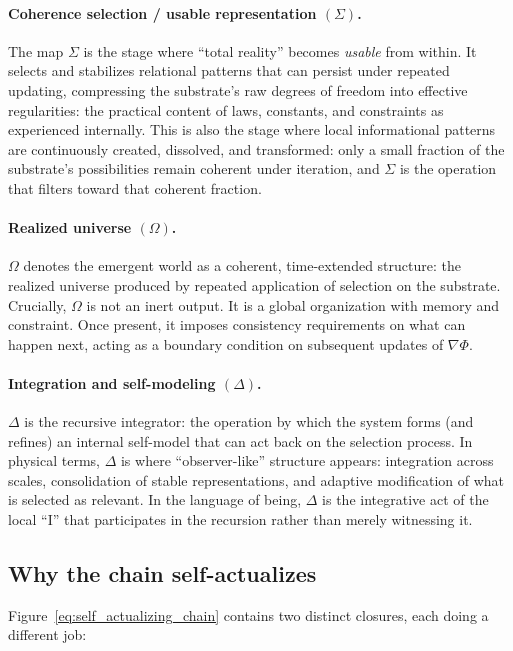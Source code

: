 \documentclass[11pt]{article}
\begin{document}
\paragraph{Coherence selection / usable representation $(\Sigma)$.}
The map $\Sigma$ is the stage where ``total reality'' becomes \emph{usable} from within.
It selects and stabilizes relational patterns that can persist under repeated updating, compressing the substrate's raw
degrees of freedom into effective regularities: the practical content of laws, constants, and constraints as experienced
internally. This is also the stage where local informational patterns are continuously created, dissolved, and transformed:
only a small fraction of the substrate's possibilities remain coherent under iteration, and $\Sigma$ is the operation that
filters toward that coherent fraction.

\paragraph{Realized universe $(\Omega)$.}
$\Omega$ denotes the emergent world as a coherent, time-extended structure: the realized universe produced by repeated
application of selection on the substrate.
Crucially, $\Omega$ is not an inert output. It is a global organization with memory and constraint.
Once present, it imposes consistency requirements on what can happen next, acting as a boundary condition on subsequent
updates of $\nabla\Phi$.

\paragraph{Integration and self-modeling $(\Delta)$.}
$\Delta$ is the recursive integrator: the operation by which the system forms (and refines) an internal self-model that
can act back on the selection process.
In physical terms, $\Delta$ is where ``observer-like'' structure appears: integration across scales, consolidation of
stable representations, and adaptive modification of what is selected as relevant.
In the language of being, $\Delta$ is the integrative act of the local ``I'' that participates in the recursion rather
than merely witnessing it.

\subsection{Why the chain self-actualizes}
Figure~\eqref{eq:self_actualizing_chain} contains two distinct closures, each doing a different job:
\end{document}
